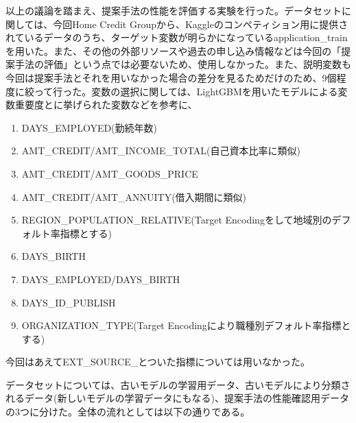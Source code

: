 \documentclass[11pt]{jsarticle}
\providecommand{\tightlist}{%
      \setlength{\itemsep}{0pt}\setlength{\parskip}{0pt}}
\begin{document}
以上の議論を踏まえ、提案手法の性能を評価する実験を行った。データセットに関しては、今回Home
Credit
Groupから、Kaggleのコンペティション用に提供されているデータのうち、ターゲット変数が明らかになっているapplication\_trainを用いた。また、その他の外部リソースや過去の申し込み情報などは今回の「提案手法の評価」という点では必要ないため、使用しなかった。また、説明変数も今回は提案手法とそれを用いなかった場合の差分を見るためだけのため、9個程度に絞って行った。変数の選択に関しては、LightGBMを用いたモデル\cite{LGBM}による変数重要度と\cite{stepwisebayse}に挙げられた変数などを参考に、

\begin{enumerate}
\def\labelenumi{\arabic{enumi}.}
\tightlist
\item
  DAYS\_EMPLOYED(勤続年数)
\item
  AMT\_CREDIT/AMT\_INCOME\_TOTAL(自己資本比率に類似)
\item
  AMT\_CREDIT/AMT\_GOODS\_PRICE
\item
  AMT\_CREDIT/AMT\_ANNUITY(借入期間に類似)
\item
  REGION\_POPULATION\_RELATIVE(Target
  Encodingをして地域別のデフォルト率指標とする)
\item
  DAYS\_BIRTH
\item
  DAYS\_EMPLOYED/DAYS\_BIRTH
\item
  DAYS\_ID\_PUBLISH
\item
  ORGANIZATION\_TYPE(Target Encodingにより職種別デフォルト率指標とする)
\end{enumerate}

今回はあえてEXT\_SOURCE\_とついた指標については用いなかった。

データセットについては、古いモデルの学習用データ、古いモデルにより分類されるデータ(新しいモデルの学習データにもなる)、提案手法の性能確認用データの3つに分けた。全体の流れとしては以下の通りである。
\end{document}
